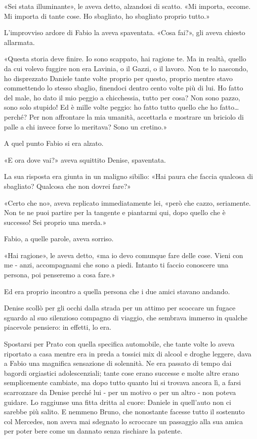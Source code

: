«Sei stata illuminante», le aveva detto, alzandosi di scatto. «Mi importa, eccome. Mi importa di tante cose. Ho sbagliato, ho sbagliato proprio tutto.»

L'improvviso ardore di Fabio la aveva spaventata. «Cosa fai?», gli aveva chiesto allarmata.

«Questa storia deve finire. Io sono scappato, hai ragione te. Ma in realtà, quello da cui volevo fuggire non era Lavinia, o il Gazzi, o il lavoro. Non te lo nascondo, ho disprezzato Daniele tante volte proprio per questo, proprio mentre stavo commettendo lo stesso sbaglio, finendoci dentro cento volte più di lui. Ho fatto del male, ho dato il mio peggio a chicchessia, tutto per cosa? Non sono pazzo, sono solo stupido! Ed è mille volte peggio: ho fatto tutto quello che ho fatto\ldots perché? Per non affrontare la mia umanità, accettarla e mostrare un briciolo di palle a chi invece forse lo meritava? Sono un cretino.»

A quel punto Fabio si era alzato.

«E ora dove vai?» aveva squittito Denise, spaventata.

La sua risposta era giunta in un maligno sibilìo: «Hai paura che faccia qualcosa di sbagliato? Qualcosa che non dovrei fare?»

«Certo che no», aveva replicato immediatamente lei, «però che cazzo, seriamente. Non te ne puoi partire per la tangente e piantarmi qui, dopo quello che è successo! Sei proprio una merda.»

Fabio, a quelle parole, aveva sorriso.

«Hai ragione», le aveva detto, «ma io devo comunque fare delle cose. Vieni con me - anzi, accompagnami che sono a piedi. Intanto ti faccio conoscere una persona, poi penseremo a cosa fare.»

Ed era proprio incontro a quella persona che i due amici stavano andando.

Denise scollò per gli occhi dalla strada per un attimo per scoccare un fugace sguardo al suo silenzioso compagno di viaggio, che sembrava immerso in qualche piacevole pensiero: in effetti, lo era.

Spostarsi per Prato con quella specifica automobile, che tante volte lo aveva riportato a casa mentre era in preda a tossici mix di alcool e droghe leggere, dava a Fabio una magnifica sensazione di solennità. Ne era passato di tempo dai bagordi orgiastici adolescenziali; tante cose erano successe e molte altre erano semplicemente cambiate, ma dopo tutto quanto lui si trovava ancora lì, a farsi scarrozzare da Denise perché lui - per un motivo o per un altro - non poteva guidare. Lo raggiunse una fitta dritta al cuore: Daniele in quell'auto non ci sarebbe più salito. E nemmeno Bruno, che nonostante facesse tutto il sostenuto col Mercedes, non aveva mai sdegnato lo scroccare un passaggio alla sua amica per poter bere come un dannato senza rischiare la patente.


